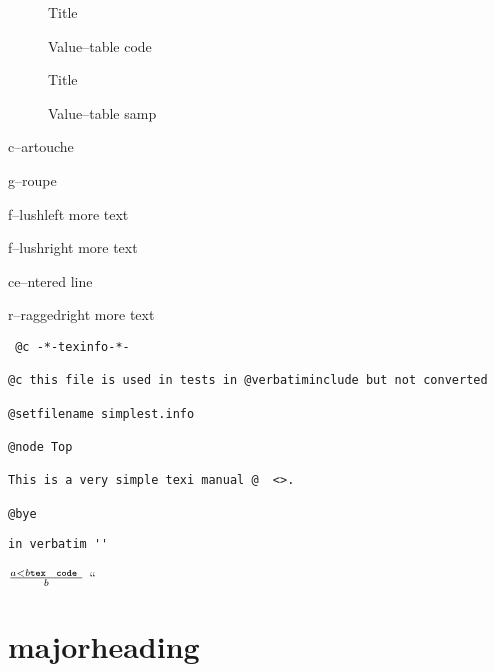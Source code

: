 \documentclass{book}
\newcommand\GNUTexinfotablestylesamp[1]{\ifstrempty{#1}{}{{`\texttt{#1}'}}}%
\newcommand{\GNUTexinfoplaceholder}[1]{}
\newcommand{\GNUTexinfonopagebreakheading}[2]{\let\clearpage\relax \let\cleardoublepage\relax \let\thispagestyle\GNUTexinfoplaceholder #1{#2}}
\begin{document}
\begin{description}
\item[] Title
\item[{\parbox[b]{\linewidth}{%
\texttt{a{-}{-}code}}}]
Value--table code
\end{description}

\begin{description}
\item[] Title
\item[{\parbox[b]{\linewidth}{%
\GNUTexinfotablestylesamp{a{-}{-}samp}\\
\GNUTexinfotablestylesamp{a2{-}{-}samp}}}]
Value--table samp
\end{description}

\begin{mdframed}[style=GNUTexinfocartouche]
c--artouche
\end{mdframed}

g--roupe

f--lushleft
more text

f--lushright
more text

\begin{center}
ce--ntered line
\end{center}

\begin{flushleft}
r--raggedright
more text
\end{flushleft}

\begin{verbatim}
 @c -*-texinfo-*-

@c this file is used in tests in @verbatiminclude but not converted

@setfilename simplest.info

@node Top

This is a very simple texi manual @  <>.

@bye
\end{verbatim}

\begin{verbatim}
in verbatim ''
\end{verbatim}





$\frac{a < b \texttt{tex \hbox{ code }}}{b}$ ``

\GNUTexinfonopagebreakheading{\chapter*}{majorheading}
\end{document}

